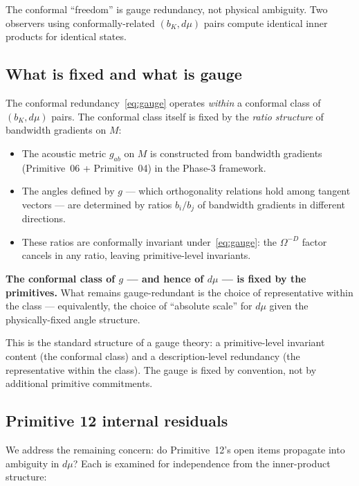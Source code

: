 \documentclass[11pt,a4paper]{article}
\begin{document}
The conformal ``freedom'' is gauge redundancy, not physical ambiguity. Two observers using conformally-related $(b_K, d\mu)$ pairs compute identical inner products for identical states.

\subsection{What is fixed and what is gauge}

The conformal redundancy~\eqref{eq:gauge} operates \emph{within} a conformal class of $(b_K, d\mu)$ pairs. The conformal class itself is fixed by the \emph{ratio structure} of bandwidth gradients on $M$:

\begin{itemize}
  \item The acoustic metric $g_{ab}$ on $M$ is constructed from bandwidth gradients (Primitive~06 + Primitive~04) in the Phase-3 framework.
  \item The angles defined by $g$ --- which orthogonality relations hold among tangent vectors --- are determined by ratios $b_i / b_j$ of bandwidth gradients in different directions.
  \item These ratios are conformally invariant under~\eqref{eq:gauge}: the $\Omega^{-D}$ factor cancels in any ratio, leaving primitive-level invariants.
\end{itemize}

\textbf{The conformal class of $g$ --- and hence of $d\mu$ --- is fixed by the primitives.} What remains gauge-redundant is the choice of representative within the class --- equivalently, the choice of ``absolute scale'' for $d\mu$ given the physically-fixed angle structure.

This is the standard structure of a gauge theory: a primitive-level invariant content (the conformal class) and a description-level redundancy (the representative within the class). The gauge is fixed by convention, not by additional primitive commitments.

\subsection{Primitive 12 internal residuals}

We address the remaining concern: do Primitive~12's open items propagate into ambiguity in $d\mu$? Each is examined for independence from the inner-product structure:
\end{document}
